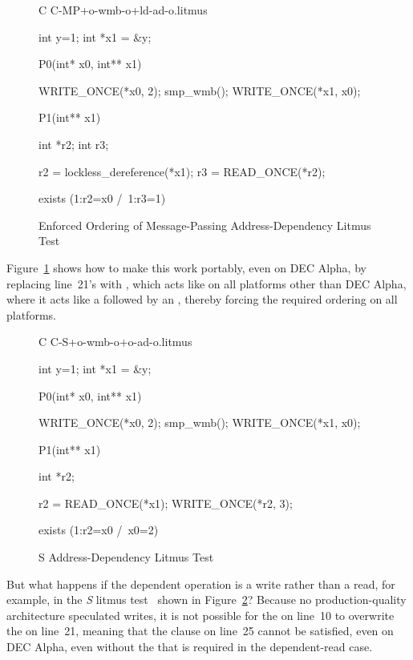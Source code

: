\begin{figure}[tbp]
{ \scriptsize
\begin{verbbox}[\LstLineNo]
C C-MP+o-wmb-o+ld-ad-o.litmus

{
int y=1;
int *x1 = &y;
}

P0(int* x0, int** x1) {

  WRITE_ONCE(*x0, 2);
  smp_wmb();
  WRITE_ONCE(*x1, x0);

}

P1(int** x1) {

  int *r2;
  int r3;

  r2 = lockless_dereference(*x1);
  r3 = READ_ONCE(*r2);

}

exists (1:r2=x0 /\ 1:r3=1)
\end{verbbox}
}
\centering
\theverbbox
\caption{Enforced Ordering of Message-Passing Address-Dependency Litmus Test}
\label{fig:advsync:Enforced Ordering of Message-Passing Address-Dependency Litmus Test}
\end{figure}

Figure~\ref{fig:advsync:Enforced Ordering of Message-Passing Address-Dependency Litmus Test}
shows how to make this work portably, even on DEC Alpha, by
replacing line~21's  with ,
which acts like  on all platforms other than DEC Alpha,
where it acts like a  followed by an ,
thereby forcing the required ordering on all platforms.

\begin{figure}[tbp]
{ \scriptsize
\begin{verbbox}[\LstLineNo]
C C-S+o-wmb-o+o-ad-o.litmus

{
int y=1;
int *x1 = &y;
}

P0(int* x0, int** x1) {

  WRITE_ONCE(*x0, 2);
  smp_wmb();
  WRITE_ONCE(*x1, x0);

}

P1(int** x1) {

  int *r2;

  r2 = READ_ONCE(*x1);
  WRITE_ONCE(*r2, 3);

}

exists (1:r2=x0 /\ x0=2)
\end{verbbox}
}
\centering
\theverbbox
\caption{S Address-Dependency Litmus Test}
\label{fig:advsync:S Address-Dependency Litmus Test}
\end{figure}

But what happens if the dependent operation is a write rather than
a read, for example, in the \emph{S}
litmus test~\cite{JadeAlglave2011ppcmem} shown in
Figure~\ref{fig:advsync:S Address-Dependency Litmus Test}?
Because no production-quality architecture speculated writes,
it is not possible for the  on line~10 to overwrite
the  on line~21, meaning that the 
clause on line~25 cannot be satisfied, even on DEC Alpha, even
without the  that is required in the
dependent-read case.

